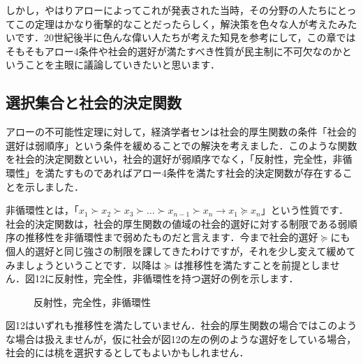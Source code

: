 しかし，やはりアローによってこれが発表された当時，その分野の人たちにとってこの定理はかなり衝撃的なことだったらしく，解決策を色々な人が考えたみたいです．20世紀後半に色んな偉い人たちが考えた知見を参考にして，この章ではそもそもアロー4条件や社会的選好が満たすべき性質が民主制に不可欠なのかということを主眼に議論していきたいと思います．

\subsection{選択集合と社会的決定関数}
アローの不可能性定理に対して，経済学者センは社会的厚生関数の条件「社会的選好は弱順序」という条件を緩めることでの解決を考えました．このような関数を社会的決定関数といい，社会的選好が弱順序でなく，「反射性，完全性，非循環性」を満たすものであればアロー4条件を満たす社会的決定関数が存在することを示しました．

非循環性とは，「$x_1 \succ x_2 \succ x_3 \succ \dots \succ x_{n-1} \succ x_n \to  x_1 \succeq x_n$」という性質です．社会的決定関数は，社会的厚生関数の値域の社会的選好に対する制限である弱順序の推移性を非循環性まで弱めたものだと言えます．今まで社会的選好$\succeq$にも個人的選好と同じ強さの制限を課してきたわけですが，それを少し変えて緩めてみましょうということです．以降は$\succeq$は推移性を満たすことを前提としません．図12に反射性，完全性，非循環性を持つ選好の例を示します．

\begin{figure}[!h]
    \centering
    {
        }
        \caption{反射性，完全性，非循環性}
\end{figure}

図12はいずれも推移性を満たしていません．社会的厚生関数の場合ではこのような場合は扱えませんが，仮に社会が図12の左の例のような選好をしている場合，社会的には桃を選択するとしてもよいかもしれません．

